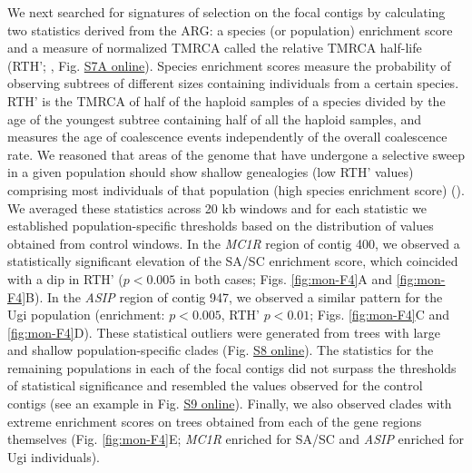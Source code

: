 We next searched for signatures of selection on the focal contigs by calculating two statistics derived from the \acf{ARG}: a species (or population) enrichment score and a measure of normalized \ac{TMRCA} called the relative \ac{TMRCA} half-life (\acs{RTH}’; \cite{rasmussen_genome-wide_2014,hejase_genomic_2020}, Fig. \href{https://journals.plos.org/PLOSGENETICS/article?id=10.1371/journal.pgen.1010474#sec017}{S7A online}). Species enrichment scores measure the probability of observing subtrees of different sizes containing individuals from a certain species. \acs{RTH}’ is the \ac{TMRCA} of half of the haploid samples of a species divided by the age of the youngest subtree containing half of all the haploid samples, and measures the age of coalescence events independently of the overall coalescence rate. We reasoned that areas of the genome that have undergone a selective sweep in a given population should show shallow genealogies (low \acs{RTH}’ values) comprising most individuals of that population (high species enrichment score) (\cite{hejase_genomic_2020}). We averaged these statistics across 20 kb windows and for each statistic we established population-specific thresholds based on the distribution of values obtained from control windows. In the \textit{MC1R} region of contig 400, we observed a statistically significant elevation of the \ac{SA/SC} enrichment score, which coincided with a dip in \acs{RTH}’ ($p<0.005$ in both cases; Figs. \ref{fig:mon-F4}A and \ref{fig:mon-F4}B). In the \textit{ASIP} region of contig 947, we observed a similar pattern for the Ugi population (enrichment: $p<0.005$, \acs{RTH}’ $p<0.01$; Figs. \ref{fig:mon-F4}C and \ref{fig:mon-F4}D). These statistical outliers were generated from trees with large and shallow population-specific clades (Fig. \href{https://journals.plos.org/PLOSGENETICS/article?id=10.1371/journal.pgen.1010474#sec017}{S8 online}). The statistics for the remaining populations in each of the focal contigs did not surpass the thresholds of statistical significance and resembled the values observed for the control contigs (see an example in Fig. \href{https://journals.plos.org/PLOSGENETICS/article?id=10.1371/journal.pgen.1010474#sec017}{S9 online}). Finally, we also observed clades with extreme enrichment scores on trees obtained from each of the gene regions themselves (Fig. \ref{fig:mon-F4}E; \textit{MC1R} enriched for \ac{SA/SC} and \textit{ASIP} enriched for Ugi individuals).

